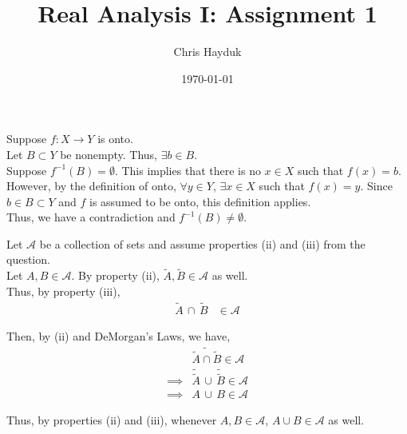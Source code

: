 \documentclass[12pt]{article}
\newenvironment{problem}[2][Problem]{\begin{trivlist}
\item[\hskip \labelsep {\bfseries #1}\hskip \labelsep {\bfseries #2.}]}{\end{trivlist}}
\begin{document}
\title{Real Analysis I: Assignment 1}

\author{Chris Hayduk}
\date{\today}

\maketitle

\begin{problem}{1}
\end{problem}

Suppose $f: X \to Y$ is onto.\\

Let $B \subset Y$ be nonempty. Thus, $\exists b \in B$.\\

Suppose $f^{-1}(B) = \emptyset$. This implies that there is no $x \in X$ such that $f(x) = b$.\\

However, by the definition of onto, $\forall y \in Y$, $\exists x \in X$ such that $f(x) = y$. Since $b \in B \subset Y$ and $f$ is assumed to be onto, this definition applies.\\

Thus, we have a contradiction and $f^{-1}(B) \neq \emptyset$.

\begin{problem}{2}
\end{problem}

Let $\mathscr{A}$ be a collection of sets and assume properties (ii) and (iii) from the question.\\

Let $A, B \in \mathscr{A}$. By property (ii), $\tilde{A}, \tilde{B} \in \mathscr{A}$ as well.\\

Thus, by property (iii),
\begin{align*}
\tilde{A} \, \cap \, \tilde{B} &\in \mathscr{A}
\end{align*}

Then, by (ii) and DeMorgan's Laws, we have,
\begin{align*}
&\widetilde{\tilde{A} \cap \tilde{B}} \in \mathscr{A}\\
\implies &\tilde{\tilde{A}} \, \cup \, \tilde{\tilde{B}} \in \mathscr{A}\\
\implies &A \, \cup \, B \in \mathscr{A}
\end{align*}

Thus, by properties (ii) and (iii), whenever $A, B \in \mathscr{A}$, $A \cup B \in \mathscr{A}$ as well.
\end{document}
